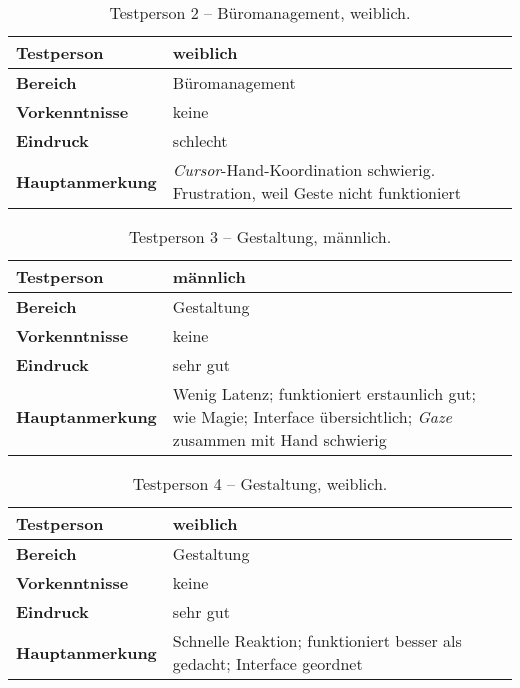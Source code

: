 \begin{table}[H]
	\centering
	\begin{tabular}{|l|p{8cm}|}
		\hline
		\textbf{Testperson} & weiblich  \\
		\hline
		\textbf{Bereich} & Büromanagement \\
		\hline
		\textbf{Vorkenntnisse} & keine \\
		\hline
		\textbf{Eindruck} & schlecht \\
		\hline
		\textbf{Hauptanmerkung} & \textit{Cursor}-Hand-Koordination schwierig. Frustration, weil Geste nicht funktioniert\\
		\hline
	\end{tabular}
	\caption{Testperson 2 -- Büromanagement, weiblich.}
	\label{tab:scoreOffice2}
\end{table}
\begin{table}[H]
	\centering
	\begin{tabular}{|l|p{8cm}|}
		\hline
		\textbf{Testperson} & männlich  \\
		\hline
		\textbf{Bereich} & Gestaltung \\
		\hline
		\textbf{Vorkenntnisse} & keine \\
		\hline
		\textbf{Eindruck} & sehr gut \\
		\hline
		\textbf{Hauptanmerkung} & Wenig Latenz; funktioniert erstaunlich gut; \frqq wie Magie\flqq; Interface übersichtlich; \textit{Gaze} zusammen mit Hand schwierig\\
		\hline
	\end{tabular}
	\caption{Testperson 3 -- Gestaltung, männlich.}
	\label{tab:scoreDesign1}
\end{table}
\begin{table}[H]
	\centering
	\begin{tabular}{|l|p{8cm}|}
		\hline
		\textbf{Testperson} & weiblich  \\
		\hline
		\textbf{Bereich} & Gestaltung \\
		\hline
		\textbf{Vorkenntnisse} & keine \\
		\hline
		\textbf{Eindruck} & sehr gut \\
		\hline
		\textbf{Hauptanmerkung} & Schnelle Reaktion; funktioniert besser als gedacht; Interface geordnet\\
		\hline
	\end{tabular}
	\caption{Testperson 4 -- Gestaltung, weiblich.}
	\label{tab:scoreDesign2}
\end{table}
